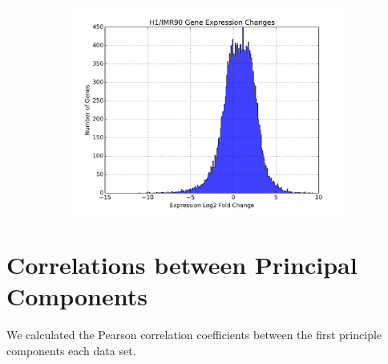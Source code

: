 \begin{figure}
  \quad

  \begin{subfigure}[b]{0.45\textwidth}
    \includegraphics[width=\textwidth]{./fig/supplementary/expressionDelta.png}\label{fig:i90h1expression}
  \end{subfigure}
\end{figure}

\section*{Correlations between Principal Components}

We calculated the Pearson correlation coefficients between the first principle components each data set.

